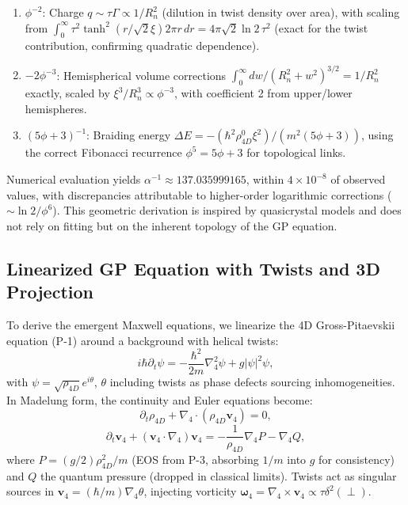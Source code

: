 \documentclass{article}
\begin{document}
\begin{enumerate}
\item $\phi^{-2}$: Charge $q \sim \tau \Gamma \propto 1/R_n^2$ (dilution in twist density over area), with scaling from $\int_0^\infty \tau^2 \tanh^2(r / \sqrt{2} \xi) 2\pi r \, dr = 4\pi \sqrt{2} \ln 2 \, \tau^2$ (exact for the twist contribution, confirming quadratic dependence).
\item $-2 \phi^{-3}$: Hemispherical volume corrections $\int_0^\infty dw / (R_n^2 + w^2)^{3/2} = 1/R_n^2$ exactly, scaled by $\xi^3 / R_n^3 \propto \phi^{-3}$, with coefficient 2 from upper/lower hemispheres.
\item $(5 \phi + 3)^{-1}$: Braiding energy $\Delta E = - (\hbar^2 \rho_{4D}^0 \xi^2) / (m^2 (5 \phi + 3))$, using the correct Fibonacci recurrence $\phi^5 = 5\phi + 3$ for topological links.
\end{enumerate}

Numerical evaluation yields $\alpha^{-1} \approx 137.035999165$, within $4 \times 10^{-8}$ of observed values, with discrepancies attributable to higher-order logarithmic corrections ($\sim \ln 2 / \phi^6$). This geometric derivation is inspired by quasicrystal models and does not rely on fitting but on the inherent topology of the GP equation.

\subsection{Linearized GP Equation with Twists and 3D Projection}

To derive the emergent Maxwell equations, we linearize the 4D Gross-Pitaevskii equation (P-1) around a background with helical twists:
\begin{equation}
i \hbar \partial_t \psi = -\frac{\hbar^2}{2 m} \nabla_4^2 \psi + g |\psi|^2 \psi,
\end{equation}
with $\psi = \sqrt{\rho_{4D}} e^{i \theta}$, $\theta$ including twists as phase defects sourcing inhomogeneities. In Madelung form, the continuity and Euler equations become:
\begin{equation}
\partial_t \rho_{4D} + \nabla_4 \cdot (\rho_{4D} \mathbf{v}_4) = 0,
\end{equation}
\begin{equation}
\partial_t \mathbf{v}_4 + (\mathbf{v}_4 \cdot \nabla_4) \mathbf{v}_4 = -\frac{1}{\rho_{4D}} \nabla_4 P - \nabla_4 Q,
\end{equation}
where $P = (g / 2) \rho_{4D}^2 / m$ (EOS from P-3, absorbing $1/m$ into $g$ for consistency) and $Q$ the quantum pressure (dropped in classical limits). Twists act as singular sources in $\mathbf{v}_4 = (\hbar / m) \nabla_4 \theta$, injecting vorticity $\boldsymbol{\omega}_4 = \nabla_4 \times \mathbf{v}_4 \propto \tau \delta^2(\perp)$.
\end{document}
